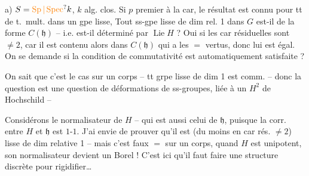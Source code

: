 a) $S=\unsure{\operatorname{Sp}|\operatorname{Spec}}k$, $k$  alg. clos. Si $p$ premier à la car, le résultat  est connu pour tt  de t.\ mult. dans un gpe lisse,
Tout ss-gpe lisse  de  dim rel. 1 dans $G$ est-il de la forme $C(\mathfrak h)$ -- i.e. est-il déterminé par $\operatorname{Lie}H$ ? Oui  si les car résiduelles sont $\ne2$, car il est contenu alors dans $C(\mathfrak h)$ qui a les $=$ vertus, donc lui est égal. On se demande si la condition de commutativité est automatiquement satisfaite ?

  On sait que c'est le cas sur un corps -- tt grpe lisse  de dim 1 est comm. -- donc la question est une question de déformations de ss-groupes, liée à un $H^2$ de Hochschild --

Considérons le normalisateur de $H$ -- qui est aussi celui de $\mathfrak h$, puisque la corr. entre $H$ et $\mathfrak h$ est $1$-$1$. J'ai envie de prouver qu'il est (du moins en car rés. $\ne2$) lisse de dim relative 1 -- mais c'est faux $=$ sur un corps, quand $H$ est unipotent, son normalisateur devient un Borel ! C'est ici qu'il faut faire 
une structure discrète pour rigidifier\ldots


